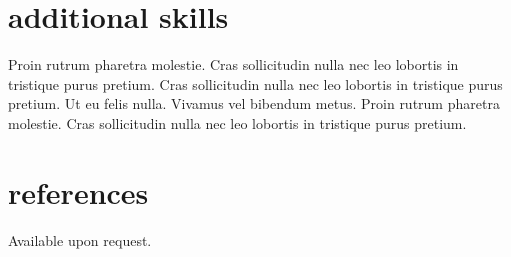 \documentclass[]{friggeri-cv}
\begin{document}
\section{additional skills}

\begin{entrylist}
  \entry
    {}
    {}
    {}
    {Proin rutrum pharetra molestie. Cras sollicitudin nulla nec leo lobortis in tristique purus pretium.}
  \entry
    {}
    {}
    {}
    {Cras sollicitudin nulla nec leo lobortis in tristique purus pretium. Ut eu felis nulla.}
  \entry
    {}
    {}
    {}
    {Vivamus vel bibendum metus. Proin rutrum pharetra molestie. Cras sollicitudin nulla nec leo lobortis in tristique purus pretium.}
\end{entrylist}

\section{references}
  \begin{entrylist}
  \entry
    {}
    {}
    {}
    {Available upon request.}
  \end{entrylist}



% 
\end{document}
